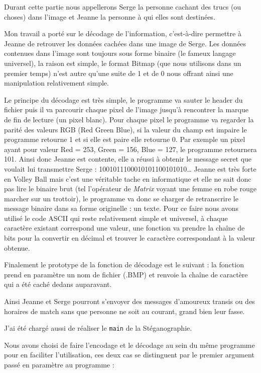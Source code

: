 \documentclass[a4paper,12pt]{article}
\begin{document}
Durant cette partie nous appellerons Serge la personne cachant des trucs (ou choses) dans l'image et Jeanne la personne à qui elles sont destinées.

Mon travail a porté sur le décodage de l'information, c'est-à-dire permettre à Jeanne de retrouver les données cachées dans une image de Serge. Les données contenues dans l'image sont toujours sous forme binaire (le fameux langage universel), la raison est simple, le format Bitmap (que nous utilisons dans un premier temps) n'est autre qu'une suite de 1 et de 0 nous offrant ainsi une manipulation relativement simple.

Le principe du décodage est très simple, le programme va sauter le header du fichier puis il va parcourir chaque pixel de l'image jusqu'à rencontrer la marque de fin de lecture (un pixel blanc). Pour chaque pixel le programme va regarder la parité des valeurs RGB (Red Green Blue), si la valeur du champ est impaire le programme retourne 1 et si elle est paire elle retourne 0. Par exemple un pixel ayant pour valeur Red = 253, Green = 156, Blue = 127, le programme retournera 101. Ainsi donc Jeanne est contente, elle a réussi à obtenir le message secret que voulait lui transmettre Serge : 1001011100010101100101010\dots{} Jeanne est très forte en Volley Ball mais c'est une véritable tache en informatique et elle ne sait donc pas lire le binaire brut (tel l'opérateur de \emph{Matrix} voyant une femme en robe rouge marcher sur un trottoir), le programme va donc se charger de retranscrire le message binaire dans sa forme originelle : un texte. Pour ce faire nous avons utilisé le code ASCII qui reste relativement simple et universel, à chaque caractère existant correspond une valeur, une fonction va prendre la chaîne de bits pour la convertir en décimal et trouver le caractère correspondant à la valeur obtenue.

Finalement le prototype de la fonction de décodage est le suivant : la fonction prend en paramètre un nom de fichier (.BMP) et renvoie la chaîne de caractère qui a été caché dedans auparavant.

Ainsi Jeanne et Serge pourront s'envoyer des messages d'amoureux transis ou des horaires de match sans que personne ne soit au courant, grand bien leur fasse.

J'ai été chargé aussi de réaliser le \texttt{main} de la Stéganographie.

Nous avons choisi de faire l'encodage et le décodage au sein du même programme pour en faciliter l'utilisation, ces deux cas se distinguent par le premier argument passé en paramètre au programme :
\end{document}
